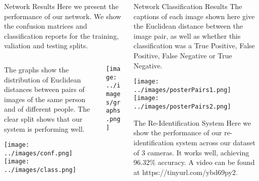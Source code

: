 \documentclass[final]{beamer}
\begin{document}
\begin{frame}{}
\begin{columns}[t]
\begin{column}{.5\linewidth}
        \begin{block}{Network Results}
        Here we present the performance of our network. We show the confusion matrices and classification reports for the training, valiation and testing splits. 
		    \begin{columns}[t]
		    
				\begin{column}{.45\linewidth}
				
				The graphs show the distribution of Euclidean distances between pairs of images of the same person and of different people. The clear split shows that our system is performing well.
				
				\vspace{.5cm}
				\texttt{[image: ../images/conf.png]}  
				\vspace{.5cm}
			 	\texttt{[image: ../images/class.png]}
			 	  
				\end{column}
		
				\begin{column}{.45\linewidth}
				
					\texttt{[image: ../images/graphs.png]}
					  
				\end{column}
			\end{columns}
        \end{block}
        
        
    
    
	 \end{column}
	 \begin{column}{.5\linewidth}
 		
 		\begin{block}{Network Classification Results}
        The captions of each image shown here give the Euclidean distance between the image pair, as well as whether this classification was a True Positive, False Positive, False Negative or True Negative. 
        
 		\texttt{[image: ../images/posterPairs1.png]}  
 		\hspace{.1cm}
 		\texttt{[image: ../images/posterPairs2.png]} 
 		
        \end{block}
        
        \begin{block}{The Re-Identification System}
        Here we show the performance of our re-identification system across our dataset of 3 cameras. It works well, achieving 96.32\% accuracy. A video can be found at https://tinyurl.com/ybd69py2.
       

\end{block}
\end{column}
\end{columns}
\end{frame}
\end{document}
